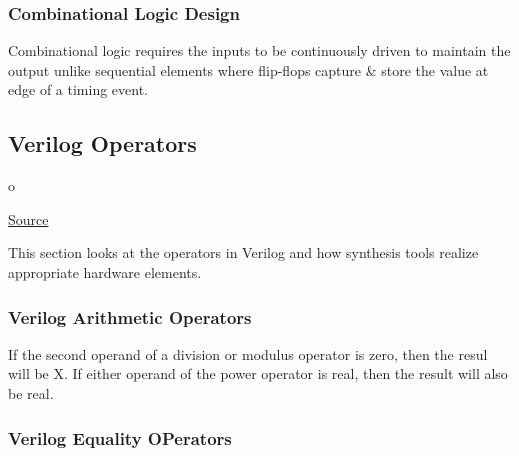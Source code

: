 \documentclass{article}
\begin{document}
	\subsubsection{Combinational Logic Design}
	Combinational logic requires the inputs to be continuously driven to maintain the output unlike sequential elements where flip-flops capture \& store the value at edge of a timing event.

	\subsection{Verilog Operators}o

	\href{https://www.chipverify.com/verilog/verilog-operators}{Source}

	This section looks at the operators in Verilog and how synthesis tools realize appropriate hardware elements.

	\subsubsection{Verilog Arithmetic Operators}

	If the second operand of a division or modulus operator is zero, then the resul will be X. If either operand of the power operator is real, then the result will also be real.

	\subsubsection{Verilog Equality OPerators}
\end{document}
